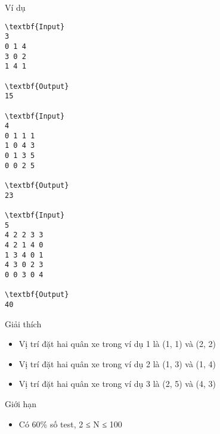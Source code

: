 Ví dụ
\begin{verbatim}
\textbf{Input}
3
0 1 4
3 0 2
1 4 1

\textbf{Output}
15

\textbf{Input}
4
0 1 1 1
1 0 4 3
0 1 3 5
0 0 2 5

\textbf{Output}
23

\textbf{Input}
5
4 2 2 3 3
4 2 1 4 0
1 3 4 0 1
4 3 0 2 3
0 0 3 0 4

\textbf{Output}
40\end{verbatim}
Giải thích
\begin{itemize}
	\item Vị trí đặt hai quân xe trong ví dụ 1 là (1, 1) và (2, 2)
	\item Vị trí đặt hai quân xe trong ví dụ 2 là (1, 3) và (1, 4)
	\item Vị trí đặt hai quân xe trong ví dụ 3 là (2, 5) và (4, 3)
\end{itemize}
Giới hạn
\begin{itemize}
	\item Có 60\% số test, 2 ≤ N ≤ 100
\end{itemize}